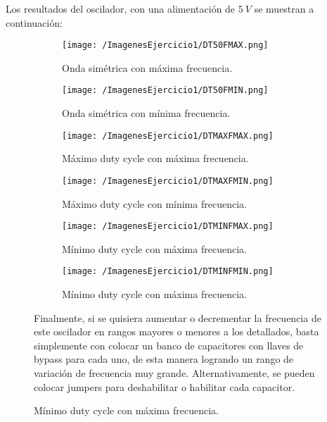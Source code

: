 Los resultados del oscilador, con una alimentación de $5 \ V$ se muestran a continuación:
\begin{figure}
\centering
\begin{subfigure}[b]{.49\linewidth}
\texttt{[image: /ImagenesEjercicio1/DT50FMAX.png]}
\caption{Onda simétrica con máxima frecuencia.}
\end{subfigure}
\begin{subfigure}[b]{.49\linewidth}
\texttt{[image: /ImagenesEjercicio1/DT50FMIN.png]}
\caption{Onda simétrica con mínima frecuencia.}
\end{subfigure}

\begin{subfigure}[b]{.49\linewidth}
\texttt{[image: /ImagenesEjercicio1/DTMAXFMAX.png]}
\caption{Máximo duty cycle con máxima frecuencia.}
\end{subfigure}
\begin{subfigure}[b]{.49\linewidth}
\texttt{[image: /ImagenesEjercicio1/DTMAXFMIN.png]}
\caption{Máximo duty cycle con mínima frecuencia.}
\end{subfigure}

\begin{subfigure}[b]{.49\linewidth}
\texttt{[image: /ImagenesEjercicio1/DTMINFMAX.png]}
\caption{Mínimo duty cycle con máxima frecuencia.}
\end{subfigure}
\begin{subfigure}[b]{.49\linewidth}
\texttt{[image: /ImagenesEjercicio1/DTMINFMIN.png]}
\caption{Mínimo duty cycle con máxima frecuencia.}
\end{subfigure}

Finalmente, si se quisiera aumentar o decrementar la frecuencia de este oscilador en rangos mayores o menores a los detallados, basta simplemente con colocar un banco de capacitores con llaves de bypass para cada uno, de esta manera logrando un rango de variación de frecuencia muy grande. Alternativamente, se pueden colocar jumpers para deshabilitar o habilitar cada capacitor. 

\end{figure}
